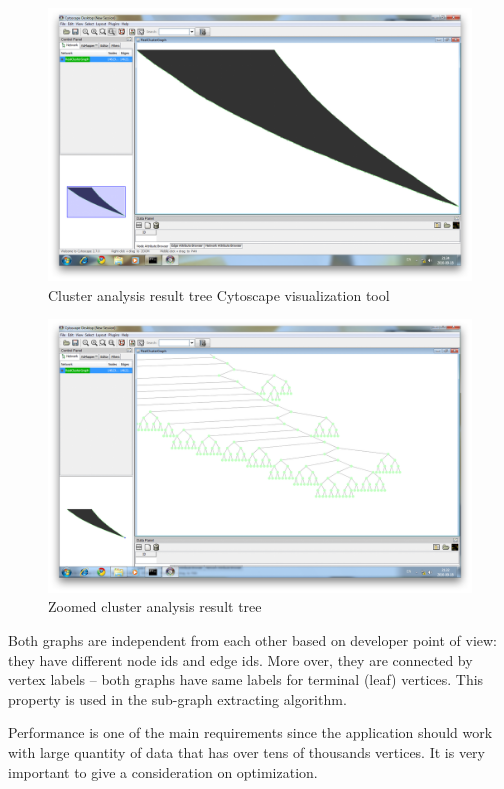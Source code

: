 \begin{figure}[h!]
\centering
\includegraphics[scale=0.25]{pictures/Cytoscape_cluster_graph_1.png}
\caption{Cluster analysis result tree Cytoscape visualization tool}
\label{fig:Cytoscape_Cluster_1}
\end{figure}

\begin{figure}[h!]
\centering
\includegraphics[scale=0.25]{pictures/Cytoscape_cluster_graph_2.png}
\caption{Zoomed cluster analysis result tree}
\label{fig:Cytoscape_Cluster_2}
\end{figure}

Both graphs are independent from each other based on developer point of view: they have different node ids and edge ids. More over, they are connected by vertex labels --
both graphs have same labels for terminal (leaf) vertices. This property is used in the sub-graph extracting algorithm.


Performance is one of the main requirements since the application should work with large quantity of data that has over tens of thousands vertices. It is very important to give a consideration on optimization.


